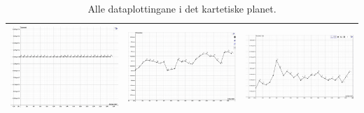 \documentclass{report}
\begin{document}
\begin{table}[H]
\begin{tabular}{|l|l|l|}
		\hline
		\includegraphics[scale=0.133]{Bileter/Salt.png}  & \includegraphics[scale=0.133]{Bileter/Temp.png}  & \includegraphics[scale=0.133]{Bileter/PLANKTON..png}    \\
		\hline
	\end{tabular}
	\caption{Alle dataplottingane i det kartetiske planet.}
	\label{F3}
\end{table}
\end{document}

